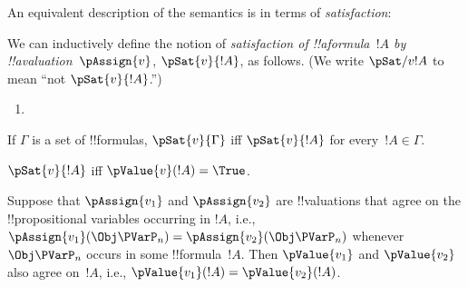\documentclass[../../../../include/open-logic-section]{subfiles}
\begin{document}
An equivalent description of the semantics is in terms of
\emph{satisfaction}:

  \begin{defn}[Satisfaction]
   We can inductively define the notion of
    \emph{satisfaction of !!a{formula}~$!A$ by
    !!a{valuation}~$\pAssign{v}$}, $\pSat{v}{!A}$, as follows.
    (We write $\pSat/{v}{!A}$ to mean ``not $\pSat{v}{!A}$.'')
  \begin{enumerate}
  
  
  \item {}
  
  
  
  
  
  \end{enumerate}
  If $\Gamma$ is a set of !!{formula}s, $\pSat{v}{\Gamma}$ iff
  $\pSat{v}{!A}$ for every~$!A \in \Gamma$.
  \end{defn}
  
  \begin{prop}
    $\pSat{v}{!A}$ iff $\pValue{v}(!A) = \True$.
  \end{prop}


  \begin{thm}
     Suppose that $\pAssign{v_1}$ and
    $\pAssign{v_2}$ are !!{valuation}s that agree on the !!{propositional
    variable}s occurring in $!A$, i.e., $\pAssign{v_1}(\Obj \PVarP_n) =
    \pAssign{v_2}(\Obj \PVarP_n)$ whenever $\Obj \PVarP_n$ occurs in some
    !!{formula}~$!A$. Then $\pValue{v_1}$ and $\pValue{v_2}$ also agree
    on~$!A$, i.e., $\pValue{v_1}(!A) = \pValue{v_2}(!A)$.
  \end{thm}
  
\end{document}
